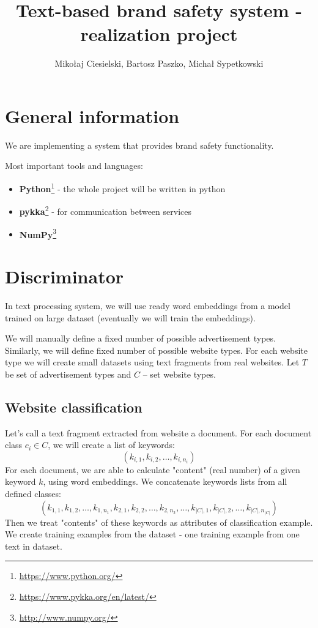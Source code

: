 \documentclass[a4paper]{article}
\begin{document}
\title{Text-based brand safety system - realization project}

\author{Mikołaj Ciesielski, Bartosz Paszko, Michał Sypetkowski}
\maketitle

\section{General information}

We are implementing a system
that provides brand safety functionality.

Most important tools and languages:
\begin{itemize}
    \item \textbf{Python}\footnote{\url{https://www.python.org/}}
        - the whole project will be written in python
    \item \textbf{pykka}\footnote{\url{https://www.pykka.org/en/latest/}}
        - for communication between services
    \item \textbf{NumPy}\footnote{\url{http://www.numpy.org/}}
\end{itemize}


\section{Discriminator}
In text processing system, we will use ready word embeddings
from a model trained on large dataset (eventually we will train the embeddings).

We will manually define a fixed number of possible advertisement types.
Similarly, we will define fixed number of possible website types.
For each website type we will create small datasets
using text fragments from real websites.
Let $T$ be set of advertisement types and $C$ -- set website types.

\subsection{Website classification}

Let's call a text fragment extracted from website a document.
For each document class $c_i\in{C}$, we will create a list of keywords:
\begin{equation}
    (k_{i,1}, k_{i,2}, \ldots, k_{i, n_i})
\end{equation}
For each document, we are able to calculate "content" (real number) of a given keyword $k$,
using word embeddings.
We concatenate keywords lists from all defined classes:
\begin{equation}
    (k_{1,1}, k_{1,2}, \ldots, k_{1, n_1},
    k_{2,1}, k_{2,2}, \ldots, k_{2, n_2},
    \ldots,
    k_{|C|,1}, k_{|C|,2}, \ldots, k_{|C|, n_{|C|}})
\end{equation}
Then we treat "contents" of these keywords as attributes of classification example.
We create training examples from the dataset - one training example from one text in dataset.
\end{document}

